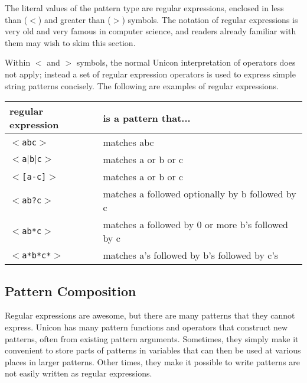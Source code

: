 The literal values of the pattern type are regular expressions,
enclosed in less than ($<$) and greater than ($>$) symbols. The
notation of regular expressions is very old and very famous in
computer science, and readers already familiar with them may wish
to skim this section.

Within $<$ and $>$ symbols, the normal Unicon interpretation of
operators does not apply; instead a set of regular expression
operators is used to express simple string patterns concisely.  The
following are examples of regular expressions.

\bigskip

\begin{tabular}{|l|l|} \hline
{\bf regular expression} & {\bf is a pattern that...} \\ \hline
\texttt{$<$abc$>$} & matches abc \\
\texttt{$<$a$|$b$|$c$>$} & matches a or b or c \\
\texttt{$<$[a-c]$>$} & matches a or b or c \\
\texttt{$<$ab?c$>$} & matches a followed optionally by b followed by c \\
\texttt{$<$ab*c$>$} & matches a followed by 0 or more b's followed by c \\
\texttt{$<$a*b*c*$>$} & matches a's followed by b's followed by c's \\ \hline
\end{tabular}

\subsection{Pattern Composition}

Regular expressions are awesome, but there are many patterns that they
cannot express. Unicon has many pattern functions and operators that
construct new patterns, often from existing pattern
arguments. Sometimes, they simply make it convenient to store parts of
patterns in variables that can then be used at various places in
larger patterns. Other times, they make it possible to write patterns
are not easily written as regular expressions.

\bigskip

